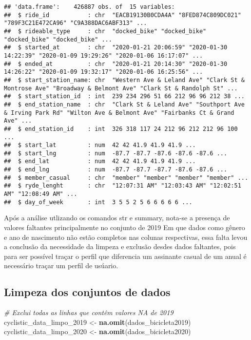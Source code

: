 \documentclass[
]{article}
\newenvironment{Shaded}{\begin{snugshade}}{\end{snugshade}}
\newcommand{\CommentTok}[1]{\textcolor[rgb]{0.56,0.35,0.01}{\textit{#1}}}
\newcommand{\FunctionTok}[1]{\textcolor[rgb]{0.13,0.29,0.53}{\textbf{#1}}}
\newcommand{\NormalTok}[1]{#1}
\newcommand{\OtherTok}[1]{\textcolor[rgb]{0.56,0.35,0.01}{#1}}
\begin{document}
\begin{verbatim}
## 'data.frame':    426887 obs. of  15 variables:
##  $ ride_id           : chr  "EACB19130B0CDA4A" "8FED874C809DC021" "789F3C21E472CA96" "C9A388DAC6ABF313" ...
##  $ rideable_type     : chr  "docked_bike" "docked_bike" "docked_bike" "docked_bike" ...
##  $ started_at        : chr  "2020-01-21 20:06:59" "2020-01-30 14:22:39" "2020-01-09 19:29:26" "2020-01-06 16:17:07" ...
##  $ ended_at          : chr  "2020-01-21 20:14:30" "2020-01-30 14:26:22" "2020-01-09 19:32:17" "2020-01-06 16:25:56" ...
##  $ start_station_name: chr  "Western Ave & Leland Ave" "Clark St & Montrose Ave" "Broadway & Belmont Ave" "Clark St & Randolph St" ...
##  $ start_station_id  : int  239 234 296 51 66 212 96 96 212 38 ...
##  $ end_station_name  : chr  "Clark St & Leland Ave" "Southport Ave & Irving Park Rd" "Wilton Ave & Belmont Ave" "Fairbanks Ct & Grand Ave" ...
##  $ end_station_id    : int  326 318 117 24 212 96 212 212 96 100 ...
##  $ start_lat         : num  42 42 41.9 41.9 41.9 ...
##  $ start_lng         : num  -87.7 -87.7 -87.6 -87.6 -87.6 ...
##  $ end_lat           : num  42 42 41.9 41.9 41.9 ...
##  $ end_lng           : num  -87.7 -87.7 -87.7 -87.6 -87.6 ...
##  $ member_casual     : chr  "member" "member" "member" "member" ...
##  $ ryde_lenght       : chr  "12:07:31 AM" "12:03:43 AM" "12:02:51 AM" "12:08:49 AM" ...
##  $ day_of_week       : int  3 5 5 2 5 6 6 6 6 6 ...
\end{verbatim}

Após a análise utlizando os comandos str e summary, nota-se a presença
de valores faltantes principalmente no conjunto de 2019 Em que dados
como gênero e ano de nascimento não estão completos nas colunas
respectivas, essa falta levou a conclusão da necessidade da limpeza e
exclusão desdes dados faltantes, pois para ser possível traçar o perfil
que diferencia um assinante casual de um anual é necessário traçar um
perfil de usúario.

\subsection{Limpeza dos conjuntos de
dados}\label{limpeza-dos-conjuntos-de-dados}

\begin{Shaded}
\begin{Highlighting}[]
\CommentTok{\# Exclui todas as linhas que contêm valores NA de 2019}
\NormalTok{cyclistic\_data\_limpo\_2019 }\OtherTok{\textless{}{-}} \FunctionTok{na.omit}\NormalTok{(dados\_bicicleta2019)}
\NormalTok{cyclistic\_data\_limpo\_2020 }\OtherTok{\textless{}{-}} \FunctionTok{na.omit}\NormalTok{(dados\_bicicleta2020)}
\end{Highlighting}
\end{Shaded}
\end{document}

